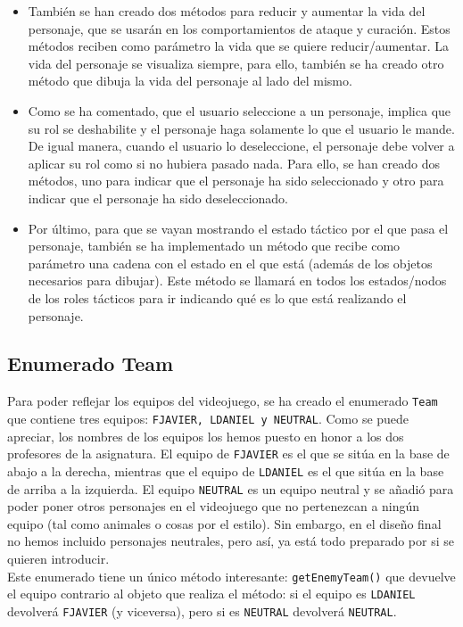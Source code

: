 \begin{itemize}
 \item También se han creado dos métodos para reducir y aumentar la vida del personaje, que se usarán en los comportamientos de ataque y curación. Estos métodos reciben como parámetro la vida que se quiere reducir/aumentar. La vida del personaje se visualiza siempre, para ello, también se ha creado otro método que dibuja la vida del personaje al lado del mismo.
 \item Como se ha comentado, que el usuario seleccione a un personaje, implica que su rol se deshabilite y el personaje haga solamente lo que el usuario le mande. De igual manera, cuando el usuario lo deseleccione, el personaje debe volver a aplicar su rol como si no hubiera pasado nada. Para ello, se han creado dos métodos, uno para indicar que el personaje ha sido seleccionado y otro para indicar que el personaje ha sido deseleccionado.
 \item Por último, para que se vayan mostrando el estado táctico por el que pasa el personaje, también se ha implementado un método que recibe como parámetro una cadena con el estado en el que está (además de los objetos necesarios para dibujar). Este método se llamará en todos los estados/nodos de los roles tácticos para ir indicando qué es lo que está realizando el personaje.
\end{itemize}



\medskip
\subsection{Enumerado Team}
Para poder reflejar los equipos del videojuego, se ha creado el enumerado \texttt{Team} que contiene tres equipos: \texttt{FJAVIER, LDANIEL y NEUTRAL}. Como se puede apreciar, los nombres de los equipos los hemos puesto en honor a los dos profesores de la asignatura. El equipo de \texttt{FJAVIER} es el que se sitúa en la base de abajo a la derecha, mientras que el equipo de \texttt{LDANIEL} es el que sitúa en la base de arriba a la izquierda. El equipo \texttt{NEUTRAL} es un equipo neutral y se añadió para poder poner otros personajes en el videojuego que no pertenezcan a ningún equipo (tal como animales o cosas por el estilo). Sin embargo, en el diseño final no hemos incluido personajes neutrales, pero así, ya está todo preparado por si se quieren introducir. \\

Este enumerado tiene un único método interesante: \texttt{getEnemyTeam()} que devuelve el equipo contrario al objeto que realiza el método: si el equipo es \texttt{LDANIEL} devolverá \texttt{FJAVIER} (y viceversa), pero si es \texttt{NEUTRAL} devolverá \texttt{NEUTRAL}.














